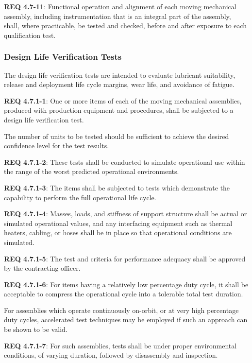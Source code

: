 \documentclass[12pt]{article}
\begin{document}
\noindent \textbf{REQ 4.7-11}: Functional operation and alignment of each moving mechanical assembly, including instrumentation that is an integral part of the assembly, shall, where practicable, be tested and checked, before and after exposure to each qualification test.


\subsubsection{Design Life Verification Tests} %
The design life verification tests are intended to evaluate lubricant suitability, release and deployment life cycle margins, wear life, and avoidance of fatigue. 

\noindent \textbf{REQ 4.7.1-1}: One or more items of each of the moving mechanical assemblies, produced with production equipment and procedures, shall be subjected to a design life verification test. 

The number of units to be tested should be sufficient to achieve the desired confidence level for the test results. 

\noindent \textbf{REQ 4.7.1-2}: These tests shall be conducted to simulate operational use within the range of the worst predicted operational environments. 

\noindent \textbf{REQ 4.7.1-3}: The items shall be subjected to tests which demonstrate the capability to perform the full operational life cycle. 

\noindent \textbf{REQ 4.7.1-4}: Masses, loads, and stiffness of support structure shall be actual or simulated operational values, and any interfacing equipment such as thermal heaters, cabling, or hoses shall be in place so that operational conditions are simulated. 

\noindent \textbf{REQ 4.7.1-5}: The test and criteria for performance adequacy shall be approved by the contracting officer. 

\noindent \textbf{REQ 4.7.1-6}: For items having a relatively low percentage duty cycle, it shall be acceptable to compress the operational cycle into a tolerable total test duration. 

For assemblies which operate continuously on-orbit, or at very high percentage duty cycles, accelerated test techniques may be employed if such an approach can be shown to be valid. 

\noindent \textbf{REQ 4.7.1-7}: For such assemblies, tests shall be under proper environmental conditions, of varying duration, followed by disassembly and inspection. 
\end{document}

